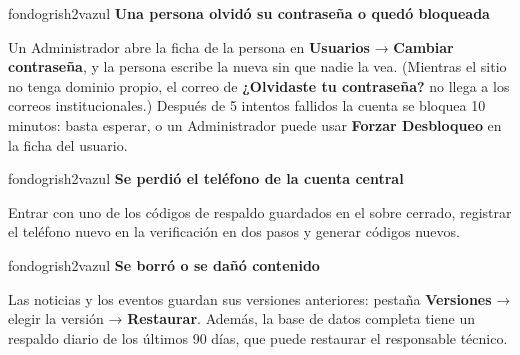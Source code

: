 \documentclass[11pt,letterpaper]{article}
\newcommand{\titulorecuadro}[2]{{\bfseries\color{#1}#2}\par\vspace{2pt}}
\begin{document}
\begin{recuadro}{fondogris}{h2vazul}
\titulorecuadro{h2vazul}{Una persona olvidó su contraseña o quedó bloqueada}
Un Administrador abre la ficha de la persona en \textbf{Usuarios} → \textbf{Cambiar contraseña}, y la persona escribe la nueva sin que nadie la vea. (Mientras el sitio no tenga dominio propio, el correo de \textbf{¿Olvidaste tu contraseña?} no llega a los correos institucionales.) Después de 5 intentos fallidos la cuenta se bloquea 10 minutos: basta esperar, o un Administrador puede usar \textbf{Forzar Desbloqueo} en la ficha del usuario.
\end{recuadro}
\begin{recuadro}{fondogris}{h2vazul}
\titulorecuadro{h2vazul}{Se perdió el teléfono de la cuenta central}
Entrar con uno de los códigos de respaldo guardados en el sobre cerrado, registrar el teléfono nuevo en la verificación en dos pasos y generar códigos nuevos.
\end{recuadro}
\begin{recuadro}{fondogris}{h2vazul}
\titulorecuadro{h2vazul}{Se borró o se dañó contenido}
Las noticias y los eventos guardan sus versiones anteriores: pestaña \textbf{Versiones} → elegir la versión → \textbf{Restaurar}. Además, la base de datos completa tiene un respaldo diario de los últimos 90 días, que puede restaurar el responsable técnico.
\end{recuadro}
\end{document}
